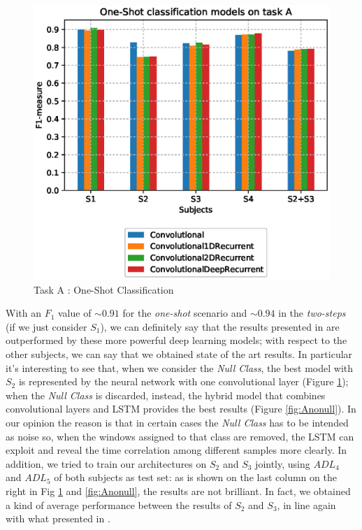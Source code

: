 \begin{figure}[ht]
	\centering
	\includegraphics[scale=.4]{figure/A_models_nullclass}
	\caption{Task A : One-Shot Classification}
	\label{fig:Anull}
\end{figure}

With an $F_1$ value of $\sim 0.91$ for the \textit{one-shot} scenario and $\sim 0.94$ in the \textit{two-steps} (if we just consider $S_1$), we can definitely say that the results presented in \cite{Chavarriaga2013} are outperformed by these more powerful deep learning models; with respect to the other subjects, we can say that we obtained state of the art results. In particular it's interesting to see that, when we consider the \textit{Null Class}, the best model with $S_2$ is represented by the neural network with one convolutional layer (Figure \ref{fig:Anull}); when the \textit{Null Class} is discarded, instead, the hybrid model that combines convolutional layers and LSTM provides the best results (Figure \ref{fig:Anonull}). In our opinion the reason is that in certain cases the \textit{Null Class} has to be intended as noise so, when the windows assigned to that class are removed, the LSTM can exploit and reveal the time correlation among different samples more clearly. In addition, we tried to train our architectures on $S_2$ and $S_3$ jointly, using $ADL_4$ and $ADL_5$ of both subjects as test set: as is shown on the last column on the right in Fig \ref{fig:Anull} and \ref{fig:Anonull}, the results are not brilliant. In fact, we obtained a kind of average performance between the results of $S_2$ and $S_3$, in line again with what presented in \cite{Chavarriaga2013}.


